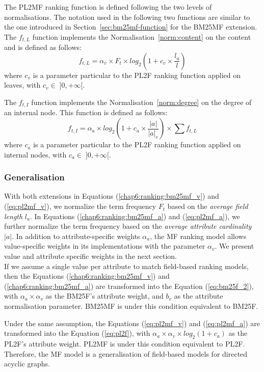 The \gls{PL2MF} ranking function is defined following the two levels of normalisations. The notation used in the following two functions are similar to the one introduced in Section~\ref{sec:bm25mf-function} for the \gls{BM25MF} extension.
The $f_{t,L}$ function implements the Normalisation~\ref{norm:content} on the content and is defined as follows:
\begin{equation}
\label{eq:pl2mf_v}
f_{t,L} = \alpha_v\times F_t \times log_2\left(1+c_v\times\frac{l_a}{l}\right)
\end{equation}
where $c_v$ is a parameter particular to the PL2F ranking function applied on leaves, with $c_v \in\; ]0,+\infty[$.

The $f_{t,I}$ function implements the Normalisation~\ref{norm:degree} on the degree of an internal node. This function is defined as follows:
\begin{equation}
\label{eq:pl2mf_a}
f_{t,I} = \alpha_a \times log_2\left(1+c_a\times\frac{\left|{a}\right|}{\left|{a}\right|_e}\right) \times \sum{f_{t,L}}
\end{equation}
where $c_a$ is a parameter particular to the PL2F ranking function applied on internal nodes, with $c_a \in\; ]0,+\infty[$.

\subsubsection{Generalisation}

With both extensions in Equations (\ref{chap6:ranking:bm25mf_v}) and (\ref{eq:pl2mf_v}), we normalize the term frequency $F_t$ based on the \emph{average field length} $l_a$. In Equations (\ref{chap6:ranking:bm25mf_a}) and (\ref{eq:pl2mf_a}), we further normalize the term frequency based on the \emph{average attribute cardinality} $\left|{a}\right|$.
In addition to attribute-specific weights $\alpha_a$, the \gls{MF} ranking model allows value-specific weights in its implementations with the parameter $\alpha_v$. We present value and attribute specific weights in the next section.\\

If we assume a single value per attribute to match field-based ranking models, then the Equations (\ref{chap6:ranking:bm25mf_v}) and (\ref{chap6:ranking:bm25mf_a}) are transformed into the Equation (\ref{eq:bm25f_2}), with $\alpha_a\times\alpha_v$ as the BM25F's attribute weight, and $b_v$ as the attribute normalisation parameter. \gls{BM25MF} is under this condition equivalent to BM25F.

Under the same assumption, the Equations (\ref{eq:pl2mf_v}) and (\ref{eq:pl2mf_a}) are transformed into the Equation (\ref{eq:pl2f}), with $\alpha_a\times\alpha_v\times log_2(1+c_a)$ as the PL2F's attribute weight. \gls{PL2MF} is under this condition equivalent to PL2F.\\

Therefore, the \gls{MF} model is a generalisation of field-based models for directed acyclic graphs.
